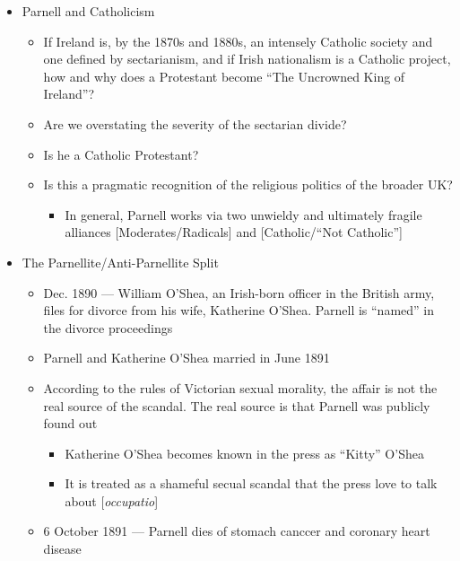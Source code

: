 \documentclass[12pt]{article}
\begin{document}
\begin{itemize}
                \item Parnell and Catholicism
                \begin{itemize}
                    \item If Ireland is, by the 1870s and 1880s, an intensely Catholic society and one defined by sectarianism, and if Irish nationalism is a Catholic project, how and why does a Protestant become ``The Uncrowned King of Ireland''?
                    \item Are we overstating the severity of the sectarian divide?
                    \item Is he a Catholic Protestant?
                    \item Is this a pragmatic recognition of the religious politics of the broader UK\@?
                    \begin{itemize}
                        \item In general, Parnell works via two unwieldy and ultimately fragile alliances [Moderates/Radicals] and [Catholic/``Not Catholic'']
                    \end{itemize}
                \end{itemize}
                \item The Parnellite/Anti-Parnellite Split
                \begin{itemize}
                    \item Dec. 1890 --- William O'Shea, an Irish-born officer in the British army, files for divorce from his wife, Katherine O'Shea. Parnell is ``named'' in the divorce proceedings
                    \item Parnell and Katherine O'Shea married in June 1891
                    \item According to the rules of Victorian sexual morality, the affair is not the real source of the scandal. The real source is that Parnell was publicly found out
                    \begin{itemize}
                        \item Katherine O'Shea becomes known in the press as ``Kitty'' O'Shea
                        \item It is treated as a shameful secual scandal that the press love to talk about [\textit{occupatio}]
                    \end{itemize}
                    \item 6 October 1891 --- Parnell dies of stomach canccer and coronary heart disease
                \end{itemize}

\end{itemize}
\end{document}
